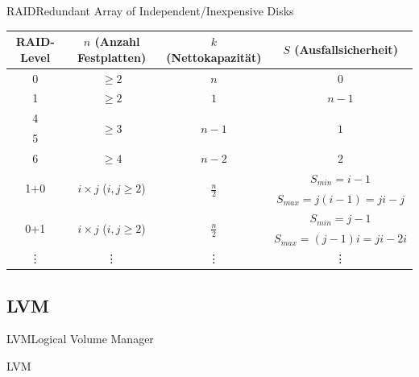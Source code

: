 \documentclass[pdflatex, ngerman]{beamer}
\begin{document}
\begin{frame}{RAID}{Redundant Array of Independent/Inexpensive Disks}
\centering\small
\begin{tabular}{| c || c | c | c |} \hline
RAID-Level & $n$ {\footnotesize(Anzahl Festplatten)} & $k$ {\footnotesize(Nettokapazität)} & $S$ {\footnotesize(Ausfallsicherheit)} \\
\hline
0 & $ \geq 2 $ & $n$ & $0$ \\
1 & $ \geq 2 $ & $1$ & $n \minus 1$ \\
4 & \multirow{2}{*}{$ \geq 3 $} & \multirow{2}{*}{$n \minus 1$} & \multirow{2}{*}{$1$} \\
5 & & & \\
6 & $ \geq 4 $ & $n \minus 2$ & $2$ \\
\hline
\multirow{2}{*}{1+0} & \multirow{2}{*}{$ i \times j $ ($i,j \geq 2 $)} &
\multirow{2}{*}{$\frac{n}{2}$} & $S_{min}=i \minus 1$ \\
& & & $S_{max}=j(i \minus 1)=ji \minus j$ \\
\multirow{2}{*}{0+1} & \multirow{2}{*}{$ i \times j $ ($i,j \geq 2 $)} &
\multirow{2}{*}{$\frac{n}{2}$} & $S_{min}=j \minus 1$ \\
& & & $S_{max}=(j \minus 1)i=ji \minus 2i$ \\
\hline
\vdots & \vdots & \vdots & \vdots \\
\hline \end{tabular}

\end{frame}

\subsection{LVM}

\begin{frame}{LVM}{Logical Volume Manager}
\begin{block}{LVM}

\end{block}
\end{frame}
\end{document}
